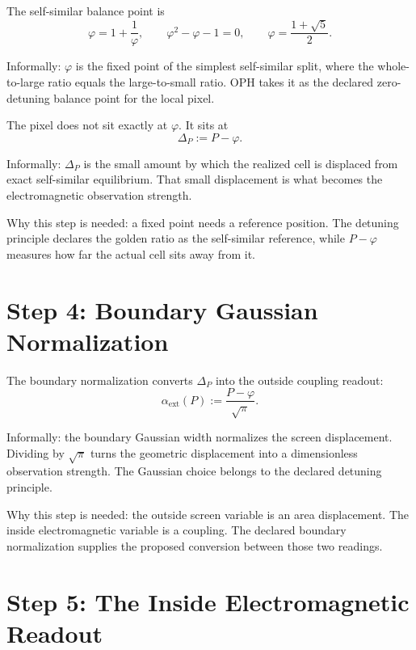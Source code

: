 \documentclass[11pt]{article}
\theoremstyle{remark}
\begin{document}
The self-similar balance point is
\begin{equation}
\varphi=1+\frac{1}{\varphi},
\qquad
\varphi^2-\varphi-1=0,
\qquad
\varphi=\frac{1+\sqrt5}{2}.
\label{eq:phi}
\end{equation}

Informally: \(\varphi\) is the fixed point of the simplest self-similar split, where the whole-to-large ratio equals the large-to-small ratio. OPH takes it as the declared zero-detuning balance point for the local pixel.

The pixel does not sit exactly at \(\varphi\). It sits at
\begin{equation}
\Delta_P:=P-\varphi.
\label{eq:deltaP}
\end{equation}

Informally: \(\Delta_P\) is the small amount by which the realized cell is displaced from exact self-similar equilibrium. That small displacement is what becomes the electromagnetic observation strength.

Why this step is needed: a fixed point needs a reference position. The detuning principle declares the golden ratio as the self-similar reference, while \(P-\varphi\) measures how far the actual cell sits away from it.

\section{Step 4: Boundary Gaussian Normalization}

The boundary normalization converts \(\Delta_P\) into the outside coupling readout:
\begin{equation}
\alpha_{\mathrm{ext}}(P):=\frac{P-\varphi}{\sqrt\pi}.
\label{eq:alphaext}
\end{equation}

Informally: the boundary Gaussian width normalizes the screen displacement. Dividing by \(\sqrt\pi\) turns the geometric displacement into a dimensionless observation strength. The Gaussian choice belongs to the declared detuning principle.

Why this step is needed: the outside screen variable is an area displacement. The inside electromagnetic variable is a coupling. The declared boundary normalization supplies the proposed conversion between those two readings.

\section{Step 5: The Inside Electromagnetic Readout}
\end{document}
